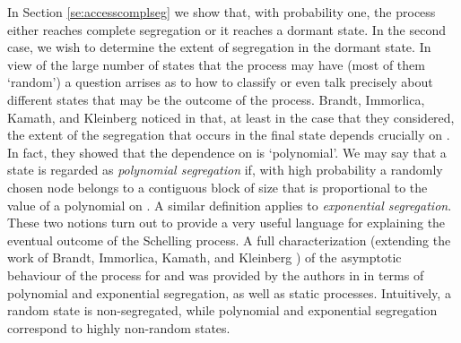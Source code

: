 \documentclass[11pt]{article}
\theoremstyle{plain}
\numberwithin{equation}{subsection}
\begin{document}
In Section \ref{se:accesscomplseg} we show that,
with probability one, the process 
 either reaches complete segregation or
it reaches a dormant state.
In the second case, we wish to 
determine the extent of segregation in the dormant state.
In view of the large number of states that the process may have
(most of them `random') a question arrises as to how to classify or even
talk precisely about different states that may be the outcome of the process.
Brandt, Immorlica, Kamath, and Kleinberg noticed in \cite{brandt:an} that, 
at least in the case  that they considered, 
the extent of the segregation that occurs in the final state
depends crucially on . In fact, they showed that
the dependence on  is `polynomial'.
We may say that
a state is regarded as {\em polynomial segregation} if, with high probability
a randomly chosen node belongs to a contiguous block of size that is proportional to 
the value of a polynomial on . A similar definition applies to 
{\em exponential segregation}. These two notions turn out to provide 
a very useful language for explaining the eventual outcome of the Schelling process.
A full characterization (extending the work of Brandt, Immorlica, Kamath, and Kleinberg 
\cite{brandt:an}) of the asymptotic behaviour of the process 
for  and  was provided by the authors in \cite{BELschel13}
in terms of polynomial and exponential segregation, as well as static processes.
Intuitively, a random state is non-segregated, while polynomial 
and exponential segregation correspond to highly non-random states.
\end{document}
